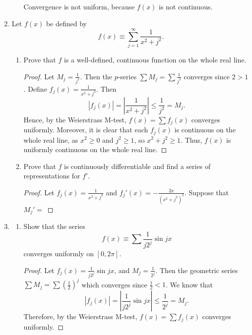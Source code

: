 \documentclass{article}
\begin{document}
\begin{enumerate}
\begin{enumerate}
                        Convergence is not uniform, because $f(x)$ is not continuous.
            \end{enumerate}
            \setcounter{enumi}{6}
      \item Let $f(x)$ be defined by
            \[
                  f(x)\equiv \sum_{j=1}^\infty\frac{1}{x^2+j^2}.
            \]
            \begin{enumerate}
                  \item Prove that $f$ is a well-defined, continuous function
                        on the whole real line.
                        \begin{proof}
                              Let $M_j=\frac{1}{j^2}$. Then the $p$-series $\sum M_j = \sum \frac{1}{j^2}$
                              converges since $2>1$. Define $f_j(x)=\frac{1}{x^2+j^2}$. Then
                              \[
                                    \left| f_j(x)\right| = \left|\frac{1}{x^2+j^2}\right| \leq \frac{1}{j^2} = M_j.
                              \]
                              Hence, by the Weierstrass M-test, $f(x)=\sum f_j(x)$ converges uniformly. Moreover,
                              it is clear that each $f_j(x)$ is continuous on the whole real line, as
                              $x^2\geq 0$ and $j^2\geq 1$, so $x^2+j^2\geq 1$. Thus, $f(x)$ is uniformly
                              continuous on the whole real line.
                        \end{proof}
                  \item Prove that $f$ is continuously differentiable and find a
                        series of representations for $f'$.
                        \begin{proof}
                              Let $f_j(x)=\frac{1}{x^2+j^2}$ and $f_j'(x)=-\frac{2x}{(x^2+j^2)^2}$.
                              Suppose that $M_j'=$
                        \end{proof}
            \end{enumerate}
            \setcounter{enumi}{10}
      \item \begin{enumerate}
                  \item Show that the series
                        \[
                              f(x)\equiv \sum \frac{1}{j2^j}\sin jx
                        \]
                        converges uniformly on $[0,2\pi]$.
                        \begin{proof}
                              Let $f_j(x)=\frac{1}{j2^j}\sin jx$, and
                              $M_j=\frac{1}{2^j}$.
                              Then the geometric series $\sum M_j=\sum\left(\frac{1}{2}\right)^j$
                              which converges since $\frac{1}{2}<1$. We know that
                              \[
                                    \left| f_j(x)\right|=\left| \frac{1}{j2^j}\sin jx\right|
                                    \leq \frac{1}{2^j}=M_j.
                              \]
                              Therefore, by the Weierstrass M-test, $f(x)=\sum f_j(x)$ converges uniformly.


\end{proof}
\end{enumerate}
\end{enumerate}
\end{document}
